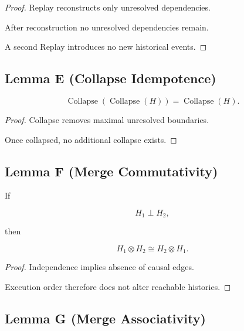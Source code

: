 \documentclass[12pt,oneside]{article}
\theoremstyle{definition}
\theoremstyle{remark}
\begin{document}
\begin{proof}

Replay reconstructs only unresolved dependencies.

After reconstruction no unresolved dependencies remain.

A second Replay introduces no new historical events.

\end{proof}

\subsection*{Lemma E (Collapse Idempotence)}

\[
\operatorname{Collapse}
(
\operatorname{Collapse}(H)
)
=
\operatorname{Collapse}(H).
\]

\begin{proof}

Collapse removes maximal unresolved boundaries.

Once collapsed, no additional collapse exists.

\end{proof}

\subsection*{Lemma F (Merge Commutativity)}

If

\[
H_1
\perp
H_2,
\]

then

\[
H_1
\otimes
H_2
\cong
H_2
\otimes
H_1.
\]

\begin{proof}

Independence implies absence of causal edges.

Execution order therefore does not alter reachable histories.

\end{proof}

\subsection*{Lemma G (Merge Associativity)}
\end{document}
